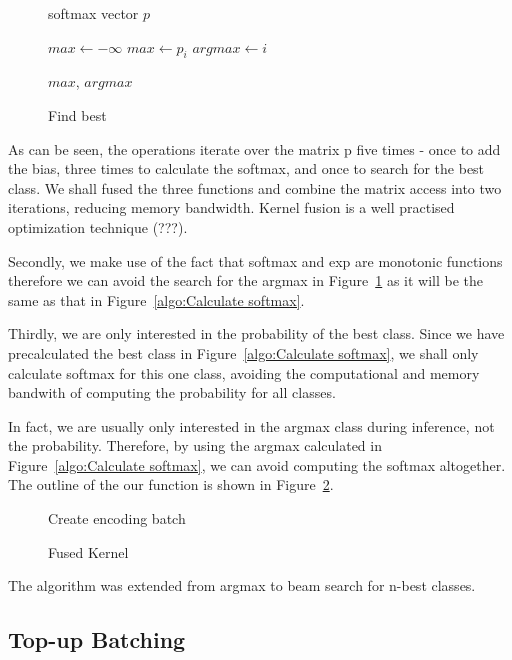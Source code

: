 \documentclass[]{article}
\begin{document}
\begin{figure} [h]
\begin{algorithmic}
\REQUIRE softmax vector $p$

\STATE $max \gets - \infty$ 
    \STATE $max \gets p_i$
    \STATE $argmax \gets i$
  \ENDIF
\ENDFOR 

\RETURN $max$, $argmax$

\end{algorithmic}
\caption{Find best}
\label{algo:Find best}
\end{figure}


As can be seen, the operations iterate over the matrix p five times - once to add the bias, three times to calculate the softmax, and once to search for the best class. We shall fused the three functions and combine the matrix access into two iterations, reducing memory bandwidth. Kernel fusion is a well practised optimization technique (???).

Secondly, we make use of the fact that softmax and exp are monotonic functions therefore we can avoid the search for the argmax in Figure~\ref{algo:Find best} as it will be the same as that in Figure~\ref{algo:Calculate softmax}.

Thirdly, we are only interested in the probability of the best class. Since we have precalculated the best class in Figure~\ref{algo:Calculate softmax}, we shall only calculate softmax for this one class, avoiding the computational and memory bandwith of computing the probability for all classes.

In fact, we are usually only interested in the argmax class during inference, not the probability. Therefore, by using the argmax calculated in Figure~\ref{algo:Calculate softmax}, we can avoid computing the softmax altogether. The outline of the our function is shown in Figure~\ref{algo:Fused Kernel}.

\begin{figure} [h]
\begin{algorithmic}
  \STATE Create encoding batch
\ENDWHILE 
\end{algorithmic}
\caption{Fused Kernel}
\label{algo:Fused Kernel}
\end{figure}

The algorithm was extended from argmax to beam search for n-best classes.

\subsection{Top-up Batching}
\end{document}
